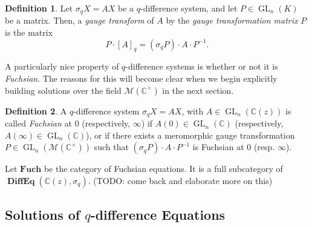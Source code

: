 \documentclass[a4paper]{report}
\theoremstyle{theorem}
\theoremstyle{definition}
\newtheorem{definition}{Definition}
\theoremstyle{remark}
\theoremstyle{proposition}
\theoremstyle{conjecture}
\theoremstyle{lemma}
\theoremstyle{corollary}
\theoremstyle{exercise}
\theoremstyle{example}
\newcommand{\C}{\mathbb{C}}
\newcommand{\mcal}{\mathcal}
\newcommand{\on}{\operatorname}
\begin{document}
  
  \begin{definition}
      Let $\sigma_qX = AX$ be a $q$-difference system, and let $P \in \on{GL}_n(K)$ be a matrix. Then, a \emph{gauge transform} of $A$ by the \emph{gauge 
      transformation matrix} $P$ is the matrix 
      $$P \cdot [A]_q = (\sigma_qP) \cdot A \cdot P^{-1}.$$
  \end{definition}
  A particularly nice property of $q$-difference systems is whether or not 
  it is \emph{Fuchsian}. The reasons for this will become clear when we 
  begin explicitly building solutions over the field $\mcal{M}(\C^\times)$ 
  in the next section.
  \begin{definition}
      A $q$-difference system $\sigma_qX = AX$, with $A \in \on{GL}_n(\C(z))$ 
      is called \emph{Fuchsian} at $0$ (respectively, $\infty$) if 
      $A(0) \in \on{GL}_n(\C)$ (respectively, $A(\infty) \in \on{GL}_n(\C)$), 
      or if there exists a meromorphic gauge transformation $P \in \on{GL}_n(\mcal{M}(\C^\times))$ such that $(\sigma_qP)\cdot A \cdot P^{-1}$ is Fuchsian at 
      $0$ (resp. $\infty$).
  \end{definition}
  Let $\mathbf{Fuch}$ be the category of Fuchsian equations. It is a full 
  subcategory of $\on{\textbf{DiffEq}}(\C(z),\sigma_q)$. (TODO: come back and 
  elaborate more on this)
  
  \subsection{Solutions of $q$-difference Equations}\label{sec_qdiff_soln}
  
\end{document}

